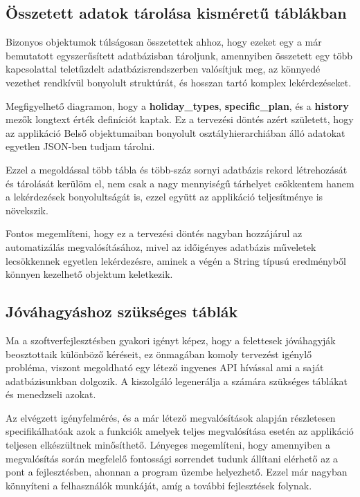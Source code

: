 \subsection{Összetett adatok tárolása kisméretű táblákban}
Bizonyos objektumok túlságosan összetettek ahhoz, hogy ezeket egy a már bemutatott egyszerűsített adatbázisban tároljunk, amennyiben összetett egy több kapcsolattal teletűzdelt adatbázisrendszerben valósítjuk meg, az könnyedé vezethet rendkívül bonyolult struktúrát, és hosszan tartó komplex lekérdezéseket.

Megfigyelhető  diagramon, hogy a \textbf{holiday\_types}, \textbf{specific\_plan}, és a \textbf{history} mezők longtext érték definíciót kaptak. Ez a tervezési döntés azért született, hogy az applikáció Belső objektumaiban bonyolult osztályhierarchiában álló adatokat egyetlen JSON-ben tudjam tárolni.

Ezzel a megoldással több tábla és több-száz sornyi adatbázis rekord létrehozását és tárolását kerülöm el, nem csak a nagy mennyiségű tárhelyet csökkentem hanem a lekérdezések bonyolultságát is, ezzel együtt az applikáció teljesítménye is növekszik.

Fontos megemlíteni, hogy ez a tervezési döntés nagyban hozzájárul az automatizálás megvalósításához, mivel az időigényes adatbázis műveletek lecsökkennek egyetlen lekérdezésre, aminek a végén a String típusú eredményből könnyen kezelhető objektum keletkezik.

\subsection{Jóváhagyáshoz szükséges táblák}
Ma a szoftverfejlesztésben gyakori igényt képez, hogy a felettesek jóváhagyják beosztottaik különböző kéréseit, ez önmagában komoly tervezést igénylő probléma, viszont megoldható egy létező ingyenes API hívással ami a saját adatbázisunkban dolgozik. A kiszolgáló legenerálja a számára szükséges táblákat és menedzseli azokat.\cite{flowable}


Az elvégzett igényfelmérés, és a már létező megvalósítások alapján részletesen specifikálhatóak azok a funkciók amelyek teljes megvalósítása esetén az applikáció teljesen elkészültnek minősíthető. Lényeges megemlíteni, hogy amennyiben a megvalósítás során megfelelő fontossági sorrendet tudunk állítani elérhető az a pont a fejlesztésben, ahonnan a program üzembe helyezhető. Ezzel már nagyban könnyíteni a felhasználók munkáját, amíg a további fejlesztések folynak.

